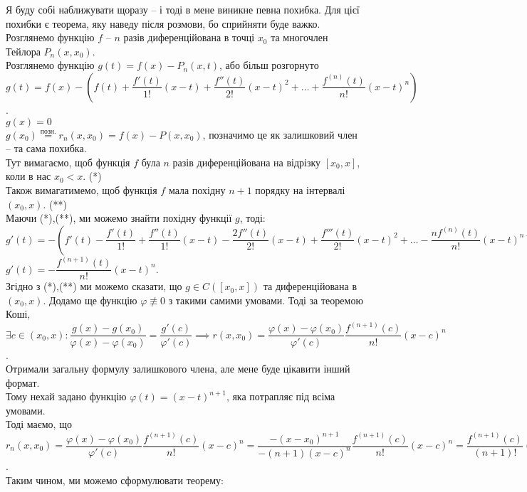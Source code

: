 \documentclass[a4paper, 14pt]{article}
\theoremstyle{theoremdd}
\theoremstyle{theoremdd}
\theoremstyle{theoremdd}
\theoremstyle{theoremdd}
\theoremstyle{theoremdd}
\theoremstyle{theoremdd}
\theoremstyle{theoremdd}
\theoremstyle{theoremdd}
\begin{document}
Я буду собі наближувати щоразу -- і тоді в мене виникне певна похибка. Для цієї похибки є теорема, яку наведу після розмови, бо сприйняти буде важко.
\bigskip \\
Розглянемо функцію $f$ -- $n$ разів диференційована в точці $x_0$ та многочлен Тейлора $P_n(x,x_0)$.\\
Розглянемо функцію $g(t) = f(x) - P_n(x,t)$, або більш розгорнуто \\ 
$g(t) = f(x) - \left( f(t) + \dfrac{f'(t)}{1!}(x-t) + \dfrac{f''(t)}{2!}(x-t)^2 + \dots + \dfrac{f^{(n)}(t)}{n!}(x-t)^n \right)$.\\
$g(x) = 0$\\
$g(x_0) \overset{\text{позн.}}{=} r_n(x,x_0) = f(x) - P(x,x_0)$, позначимо це як залишковий член -- та сама похибка.\\
Тут вимагаємо, щоб функція $f$ була $n$ разів диференційована на відрізку $[x_0,x]$, коли в нас $x_0 < x$. (*) \\
Також вимагатимемо, щоб функція $f$ мала похідну $n+1$ порядку на інтервалі $(x_0,x)$. (**)\\
Маючи (*),(**), ми можемо знайти похідну функції $g$, тоді:\\
$g'(t) = - \left(f'(t) - \dfrac{f'(t)}{1!} + \dfrac{f''(t)}{1!}(x-t) - \dfrac{2f''(t)}{2!}(x-t) + \dfrac{f'''(t)}{2!}(x-t)^2 + \dots - \dfrac{n f^{(n)}(t)}{n!}(x-t)^{n-1} + \dfrac{f^{(n+1)}(t)}{n!}(x-t)^n \right)$\\
$g'(t) = -\dfrac{f^{(n+1)}(t)}{n!}(x-t)^n$.\\
Згідно з (*),(**) ми можемо сказати, що $g \in C([x_0,x])$ та диференційована в $(x_0,x)$. Додамо ще функцію $\varphi \not\equiv 0$ з такими самими умовами. Тоді за теоремою Коші,\\
$\exists c \in (x_0,x): \dfrac{g(x)-g(x_0)}{\varphi(x)-\varphi(x_0)} = \dfrac{g'(c)}{\varphi'(c)} \implies r(x,x_0) = \dfrac{\varphi(x)-\varphi(x_0)}{\varphi'(c)} \dfrac{f^{(n+1)}(c)}{n!}(x-c)^n$.\\
Отримали загальну формулу залишкового члена, але мене буде цікавити інший формат.\\
Тому нехай задано функцію $\varphi(t) = (x-t)^{n+1}$, яка потрапляє під всіма умовами.\\
Тоді маємо, що \\ $r_n(x,x_0) = \dfrac{\varphi(x) - \varphi(x_0)}{\varphi'(c)} \dfrac{f^{(n+1)}(c)}{n!}(x-c)^n = \dfrac{-(x-x_0)^{n+1}}{-(n+1)(x-c)^{n}} \dfrac{f^{(n+1)}(c)}{n!}(x-c)^n = \dfrac{f^{(n+1)}(c)}{(n+1)!}(x-x_0)^{n+1}$.\\
Таким чином, ми можемо сформулювати теорему:
\end{document}
